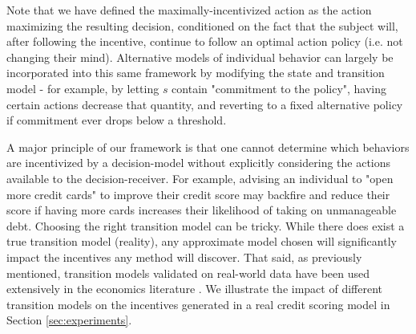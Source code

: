 Note that we have defined the maximally-incentivized action as the action maximizing the resulting decision, conditioned on the fact that the subject will, after following the incentive, continue to follow an optimal action policy (i.e. not changing their mind). Alternative models of individual behavior can largely be incorporated into this same framework by modifying the state and transition model - for example, by letting $s$ contain "commitment to the policy", having certain actions decrease that quantity, and reverting to a fixed alternative policy if commitment ever drops below a threshold.

A major principle of our framework is that one cannot determine which behaviors are incentivized by a decision-model without explicitly considering the actions available to the decision-receiver. For example, advising an individual to "open more credit cards" to improve their credit score may backfire and reduce their score if having more cards increases their likelihood of taking on unmanageable debt. Choosing the right transition model can be tricky. While there does exist a true transition model (reality), any approximate model chosen will significantly impact the incentives any method will discover. That said, as previously mentioned, transition models validated on real-world data have been used extensively in the economics literature \cite{rust1994structural}. We illustrate the impact of different transition models on the incentives generated in a real credit scoring model in Section \ref{sec:experiments}. 


